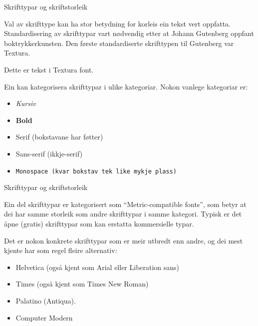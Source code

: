 \begin{frame}[containsverbatim]{Skrifttypar og skriftstorleik}
	
	Val av skrifttype kan ha stor betydning for korleis ein tekst vert oppfatta. Standardisering av skrifttypar vart nødvendig etter at Johann Gutenberg oppfant boktrykkerkunsten. Den første standardiserte skrifttypen til Gutenberg var Textura.
	
	\tgothfamily Dette er tekst i Textura font.\normalfont
	
	Ein kan kategorisera skrifttypar i ulike kategoriar. Nokon vanlege kategoriar er:
	
	\begin{itemize}
		\item \textit{Kursiv}
		\item \textbf{Bold}
		\item \textrm{Serif (bokstavane har føtter)}
		\item \textsf{Sans-serif (ikkje-serif)}
		\item \texttt{Monospace (kvar bokstav tek like mykje plass)}
	\end{itemize}
	

	
\end{frame}


\begin{frame}[containsverbatim]{Skrifttypar og skriftstorleik}
	
	Ein del skrifttypar er kategorisert som ``Metric-compatible fonts'', som betyr at dei har samme storleik som andre skrifttypar i samme kategori. Typisk er det åpne (gratis) skrifttypar som kan erstatta kommersielle typar.
		
	Det er nokon konkrete skrifttypar som er meir utbredt enn andre, og dei mest kjente har som regel fleire alternativ:
	
	\begin{itemize}
		\item Helvetica (også kjent som Arial eller Liberation sans)
		\item Times (også kjent som Times New Roman)
		\item Palatino (Antiqua).
		\item Computer Modern
	\end{itemize}
	

	
\end{frame}


